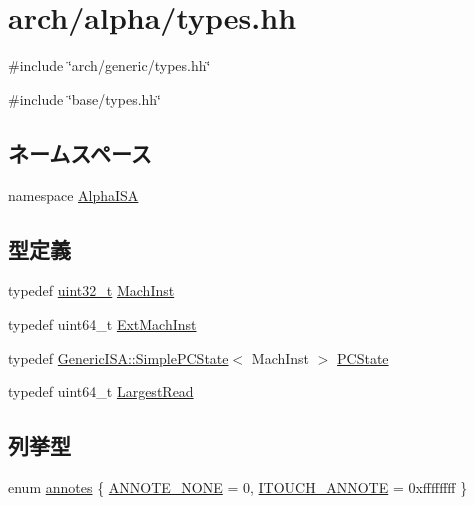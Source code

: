 \hypertarget{arch_2alpha_2types_8hh}{
\section{arch/alpha/types.hh}
\label{arch_2alpha_2types_8hh}
}
{\ttfamily \#include \char`\"{}arch/generic/types.hh\char`\"{}}\par
{\ttfamily \#include \char`\"{}base/types.hh\char`\"{}}\par
\subsection*{ネームスペース}
\begin{DoxyCompactItemize}
\item 
namespace \hyperlink{namespaceAlphaISA}{AlphaISA}
\end{DoxyCompactItemize}
\subsection*{型定義}
\begin{DoxyCompactItemize}
\item 
typedef \hyperlink{Type_8hh_a435d1572bf3f880d55459d9805097f62}{uint32\_\-t} \hyperlink{namespaceAlphaISA_a301c22ea09fa33dcfe6ddf22f203699c}{MachInst}
\item 
typedef uint64\_\-t \hyperlink{namespaceAlphaISA_aec686c38e40c7f794f1435591c15c275}{ExtMachInst}
\item 
typedef \hyperlink{classGenericISA_1_1SimplePCState}{GenericISA::SimplePCState}$<$ MachInst $>$ \hyperlink{namespaceAlphaISA_af780de49982ecf691215cac9b9dfc615}{PCState}
\item 
typedef uint64\_\-t \hyperlink{namespaceAlphaISA_a13e8c318dd29afdaf79751a072344db8}{LargestRead}
\end{DoxyCompactItemize}
\subsection*{列挙型}
\begin{DoxyCompactItemize}
\item 
enum \hyperlink{namespaceAlphaISA_afe61b52ff986be7551c135c76c5158ed}{annotes} \{ \hyperlink{namespaceAlphaISA_afe61b52ff986be7551c135c76c5158eda80d10f016be1e607c44e9f9614a86c77}{ANNOTE\_\-NONE} =  0, 
\hyperlink{namespaceAlphaISA_afe61b52ff986be7551c135c76c5158edadab3a452d0668d865718dc4c6d912244}{ITOUCH\_\-ANNOTE} =  0xffffffff
 \}
\end{DoxyCompactItemize}
